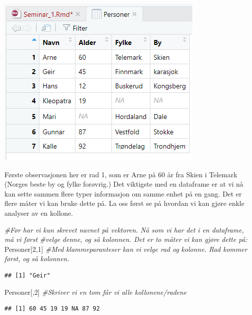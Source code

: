 \documentclass[
]{article}
\newenvironment{Shaded}{\begin{snugshade}}{\end{snugshade}}
\newcommand{\CommentTok}[1]{\textcolor[rgb]{0.56,0.35,0.01}{\textit{#1}}}
\newcommand{\DecValTok}[1]{\textcolor[rgb]{0.00,0.00,0.81}{#1}}
\newcommand{\NormalTok}[1]{#1}
\begin{document}
\includegraphics{Bilder/DF.png}

Første observasjonen her er rad 1, som er Arne på 60 år fra Skien i
Telemark (Norges beste by og fylke forøvrig.) Det viktigste med en
dataframe er at vi nå kan sette sammen flere typer informasjon om samme
enhet på en gang. Det er flere måter vi kan bruke dette på. La oss først
se på hvordan vi kan gjøre enkle analyser av en kollone.

\begin{Shaded}
\begin{Highlighting}[]
\CommentTok{#Før har vi kun skrevet navnet på vektoren. Nå som vi har det i en dataframe, må vi først}
\CommentTok{#velge denne, og så kolonnen. Det er to måter vi kan gjøre dette på:}
\NormalTok{Personer[}\DecValTok{2}\NormalTok{,}\DecValTok{1}\NormalTok{] }\CommentTok{#Med klammeparanteser kan vi velge rad og kolonne. Rad kommer først, og så kolonnen. }
\end{Highlighting}
\end{Shaded}

\begin{verbatim}
## [1] "Geir"
\end{verbatim}

\begin{Shaded}
\begin{Highlighting}[]
\NormalTok{Personer[,}\DecValTok{2}\NormalTok{] }\CommentTok{#Skriver vi en tom får vi alle kollonene/radene }
\end{Highlighting}
\end{Shaded}

\begin{verbatim}
## [1] 60 45 19 19 NA 87 92
\end{verbatim}
\end{document}
